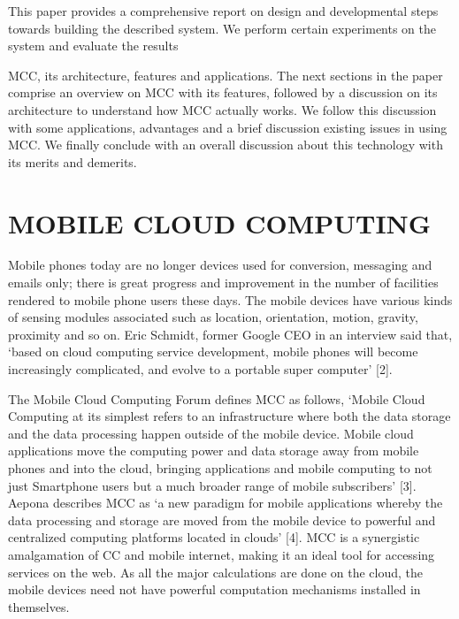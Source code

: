\documentclass[10pt, conference, compsocconf]{IEEEtran}
\begin{document}

This paper provides a comprehensive report on design and developmental steps towards building the described system. We perform certain experiments on the system and evaluate the results 

MCC, its architecture, features and applications. The next sections in the paper comprise an overview on MCC with its features, followed by a discussion on its architecture to understand how MCC actually works. We follow this discussion with some applications, advantages and a brief discussion existing issues in using MCC. We finally conclude with an overall discussion about this technology with its merits and demerits.

\section{MOBILE CLOUD COMPUTING}
Mobile phones today are no longer devices used for conversion, messaging and emails only; there is great progress and improvement in the number of facilities rendered to mobile phone users these days. The mobile devices have various kinds of sensing modules associated such as location, orientation, motion, gravity, proximity and so on. Eric Schmidt, former Google CEO in an interview said that, `based on cloud computing service development, mobile phones will become increasingly complicated, and evolve to a portable super computer' [2].



The Mobile Cloud Computing Forum defines MCC as follows, `Mobile Cloud Computing at its simplest refers to an infrastructure where both the data storage and the data processing happen outside of the mobile device. Mobile cloud applications move the computing power and data storage away from mobile phones and into the cloud, bringing applications and mobile computing to not just Smartphone users but a much broader range of mobile subscribers' [3]. Aepona describes MCC as `a new paradigm for mobile applications whereby the data processing and storage are moved from the mobile device to powerful and centralized computing platforms located in clouds' [4]. MCC is a synergistic amalgamation of CC and mobile internet, making it an ideal tool for accessing services on the web. As all the major calculations are done on the cloud, the mobile devices need not have powerful computation mechanisms installed in themselves.
\end{document}
